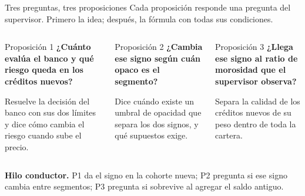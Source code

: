 \documentclass[aspectratio=169,10pt,t]{beamer}
\begin{document}
\begin{frame}{Tres preguntas, tres proposiciones}
\vspace{2mm}
Cada proposición responde una pregunta del supervisor. Primero la idea; después, la
fórmula con todas sus condiciones.
\vspace{2mm}
\begin{columns}[T,onlytextwidth]
\begin{propbox}{Proposición 1}
\small\textbf{¿Cuánto evalúa el banco y qué riesgo queda en los créditos nuevos?}

\vspace{1mm}
Resuelve la decisión del banco con sus dos límites y dice cómo cambia el riesgo
cuando sube el precio.
\end{propbox}
\begin{propbox}{Proposición 2}
\small\textbf{¿Cambia ese signo según cuán opaco es el segmento?}

\vspace{1mm}
Dice cuándo existe un umbral de opacidad que separa los dos signos, y qué supuestos
exige.
\end{propbox}
\begin{propbox}{Proposición 3}
\small\textbf{¿Llega ese signo al ratio de morosidad que el supervisor observa?}

\vspace{1mm}
Separa la calidad de los créditos nuevos de su peso dentro de toda la cartera.
\end{propbox}
\end{columns}
\vspace{2mm}
\begin{plainbox}\small
\textbf{Hilo conductor.} P1 da el signo en la cohorte nueva; P2 pregunta si ese signo
cambia entre segmentos; P3 pregunta si sobrevive al agregar el saldo antiguo.
\end{plainbox}
\end{frame}
\end{document}
